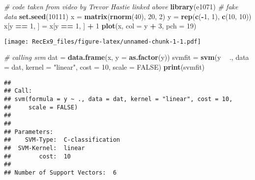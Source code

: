 \documentclass[]{article}
\newenvironment{Shaded}{\begin{snugshade}}{\end{snugshade}}
\newcommand{\KeywordTok}[1]{\textcolor[rgb]{0.13,0.29,0.53}{\textbf{#1}}}
\newcommand{\DataTypeTok}[1]{\textcolor[rgb]{0.13,0.29,0.53}{#1}}
\newcommand{\DecValTok}[1]{\textcolor[rgb]{0.00,0.00,0.81}{#1}}
\newcommand{\StringTok}[1]{\textcolor[rgb]{0.31,0.60,0.02}{#1}}
\newcommand{\CommentTok}[1]{\textcolor[rgb]{0.56,0.35,0.01}{\textit{#1}}}
\newcommand{\OtherTok}[1]{\textcolor[rgb]{0.56,0.35,0.01}{#1}}
\newcommand{\OperatorTok}[1]{\textcolor[rgb]{0.81,0.36,0.00}{\textbf{#1}}}
\newcommand{\NormalTok}[1]{#1}
\begin{document}
\begin{Shaded}
\begin{Highlighting}[]
\CommentTok{# code taken from video by Trevor Hastie linked above}
\KeywordTok{library}\NormalTok{(e1071)}
\CommentTok{# fake data}
\KeywordTok{set.seed}\NormalTok{(}\DecValTok{10111}\NormalTok{)}
\NormalTok{x =}\StringTok{ }\KeywordTok{matrix}\NormalTok{(}\KeywordTok{rnorm}\NormalTok{(}\DecValTok{40}\NormalTok{), }\DecValTok{20}\NormalTok{, }\DecValTok{2}\NormalTok{)}
\NormalTok{y =}\StringTok{ }\KeywordTok{rep}\NormalTok{(}\KeywordTok{c}\NormalTok{(}\OperatorTok{-}\DecValTok{1}\NormalTok{, }\DecValTok{1}\NormalTok{), }\KeywordTok{c}\NormalTok{(}\DecValTok{10}\NormalTok{, }\DecValTok{10}\NormalTok{))}
\NormalTok{x[y }\OperatorTok{==}\StringTok{ }\DecValTok{1}\NormalTok{, ] =}\StringTok{ }\NormalTok{x[y }\OperatorTok{==}\StringTok{ }\DecValTok{1}\NormalTok{, ] }\OperatorTok{+}\StringTok{ }\DecValTok{1}
\KeywordTok{plot}\NormalTok{(x, }\DataTypeTok{col =}\NormalTok{ y }\OperatorTok{+}\StringTok{ }\DecValTok{3}\NormalTok{, }\DataTypeTok{pch =} \DecValTok{19}\NormalTok{)}
\end{Highlighting}
\end{Shaded}

\texttt{[image: RecEx9\_files/figure-latex/unnamed-chunk-1-1.pdf]}

\begin{Shaded}
\begin{Highlighting}[]
\CommentTok{# calling svm}
\NormalTok{dat =}\StringTok{ }\KeywordTok{data.frame}\NormalTok{(x, }\DataTypeTok{y =} \KeywordTok{as.factor}\NormalTok{(y))}
\NormalTok{svmfit =}\StringTok{ }\KeywordTok{svm}\NormalTok{(y }\OperatorTok{~}\StringTok{ }\NormalTok{., }\DataTypeTok{data =}\NormalTok{ dat, }\DataTypeTok{kernel =} \StringTok{"linear"}\NormalTok{, }\DataTypeTok{cost =} \DecValTok{10}\NormalTok{, }\DataTypeTok{scale =} \OtherTok{FALSE}\NormalTok{)}
\KeywordTok{print}\NormalTok{(svmfit)}
\end{Highlighting}
\end{Shaded}

\begin{verbatim}
## 
## Call:
## svm(formula = y ~ ., data = dat, kernel = "linear", cost = 10, 
##     scale = FALSE)
## 
## 
## Parameters:
##    SVM-Type:  C-classification 
##  SVM-Kernel:  linear 
##        cost:  10 
## 
## Number of Support Vectors:  6
\end{verbatim}
\end{document}
